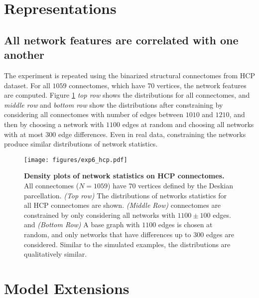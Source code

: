 \appendix


\section{Representations}

\subsection{All network features are correlated with one another}\label{sec:bag-of-features-hcp}
The experiment is repeated using the binarized structural connectomes from HCP dataset. For all $1059$ connectomes, which have 70 vertices, the network features are computed. Figure \ref{fig:exp6_hcp} \textit{top row} shows the distributions for all connectomes, and \textit{middle row} and \textit{bottom row} show the distributions after constraining by considering all connectomes with number of edges between $1010$ and $1210$, and then by choosing a network with $1100$ edges at random and choosing all networks with at most $300$ edge differences. Even in real data, constraining the networks produce similar distributions of network statistics. 

\begin{figure}[b!]
    \centering
    \texttt{[image: figures/exp6\_hcp.pdf]}
    \caption{\textbf{Density plots of network statistics on HCP connectomes.} All connectomes ($N=1059$) have 70 vertices defined by the Deskian parcellation. 
    \textit{(Top row)} The distributions of networks statistics for all HCP connectomes are shown.
    \textit{(Middle Row)} connectomes are constrained by only considering all networks with $1100 \pm 100$ edges.
    and \textit{(Bottom Row)} A base graph with $1100$ edges is chosen at random, and only networks that have differences up to $300$ edges are considered. Similar to the simulated examples, the distributions are qualitatively similar.}
    \label{fig:exp6_hcp}
\end{figure}


\section{Model Extensions}\label{sec:model_extensions}


